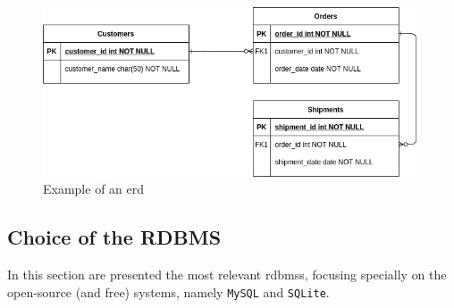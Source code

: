%
\begin{figure}[htb!]
\centering
    \includegraphics[width=0.8\columnwidth]{./img/erd-example.png}
  \caption{Example of an \gls{erd}}%
\label{fig:erd-example}
\end{figure}
%




\subsection{Choice of the RDBMS}
\label{sec:choice-rdbms}
In this section are presented the most relevant \glspl{rdbms}, focusing
specially on the open-source (and free) systems, namely \texttt{MySQL} and
\texttt{SQLite}.

